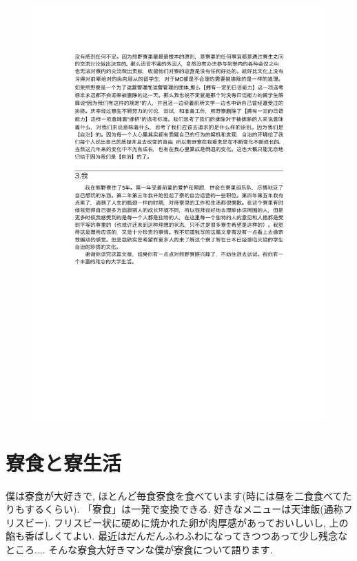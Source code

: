 \documentclass[10pt,b5jsbook,dvips,dvipdfmx,openany]{jsbook}
\theoremstyle{definition}
\begin{document}
\newpage
\begin{figure}[h]
		\begin{center}
 	 	\includegraphics[scale=0.85]{voice_2.pdf}
  \end{center}
		\end{figure}


	\section{寮食と寮生活}

	僕は寮食が大好きで, ほとんど毎食寮食を食べています(時には昼を二食食べてたりもするくらい). 「寮食」は一発で変換できる. 好きなメニューは天津飯(通称フリスビー). フリスビー状に硬めに焼かれた卵が肉厚感があっておいしいし, 上の餡も香ばしくてよい. 最近はだんだんふわふわになってきつつあって少し残念なところ.... そんな寮食大好きマンな僕が寮食について語ります.
\end{document}
